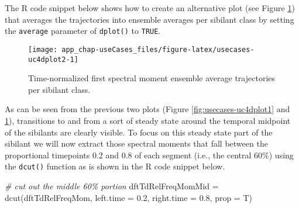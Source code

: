 \documentclass[
]{book}
\newenvironment{Shaded}{\begin{snugshade}}{\end{snugshade}}
\newcommand{\AttributeTok}[1]{\textcolor[rgb]{0.77,0.63,0.00}{#1}}
\newcommand{\CommentTok}[1]{\textcolor[rgb]{0.56,0.35,0.01}{\textit{#1}}}
\newcommand{\ConstantTok}[1]{\textcolor[rgb]{0.00,0.00,0.00}{#1}}
\newcommand{\DecValTok}[1]{\textcolor[rgb]{0.00,0.00,0.81}{#1}}
\newcommand{\FloatTok}[1]{\textcolor[rgb]{0.00,0.00,0.81}{#1}}
\newcommand{\FunctionTok}[1]{\textcolor[rgb]{0.00,0.00,0.00}{#1}}
\newcommand{\NormalTok}[1]{#1}
\newcommand{\OtherTok}[1]{\textcolor[rgb]{0.56,0.35,0.01}{#1}}
\newcommand{\SpecialCharTok}[1]{\textcolor[rgb]{0.00,0.00,0.00}{#1}}
\newcommand{\StringTok}[1]{\textcolor[rgb]{0.31,0.60,0.02}{#1}}
\begin{document}
The R code snippet below shows how to create an alternative plot (see Figure \ref{fig:usecases-uc4dplot2}) that averages the trajectories into ensemble averages per sibilant class by setting the \texttt{average} parameter of \texttt{dplot()} to \texttt{TRUE}.

\begin{Shaded}
\end{Shaded}

\begin{figure}

{\centering \texttt{[image: app\_chap-useCases\_files/figure-latex/usecases-uc4dplot2-1]} 

}

\caption{Time-normalized first spectral moment ensemble average trajectories per sibilant class.}\label{fig:usecases-uc4dplot2}
\end{figure}

As can be seen from the previous two plots (Figure \ref{fig:usecases-uc4dplot1} and \ref{fig:usecases-uc4dplot2}), transitions to and from a sort of steady state around the temporal midpoint of the sibilants are clearly visible. To focus on this steady state part of the sibilant we will now extract those spectral moments that fall between the proportional timepoints 0.2 and 0.8 of each segment (i.e., the central 60\%) using the \texttt{dcut()} function as is shown in the R code snippet below.

\begin{Shaded}
\begin{Highlighting}[]
\CommentTok{\# cut out the middle 60\% portion}
\NormalTok{dftTdRelFreqMomMid }\OtherTok{=} \FunctionTok{dcut}\NormalTok{(dftTdRelFreqMom,}
                          \AttributeTok{left.time =} \FloatTok{0.2}\NormalTok{,}
                          \AttributeTok{right.time =} \FloatTok{0.8}\NormalTok{,}
                          \AttributeTok{prop =}\NormalTok{ T)}
\end{Highlighting}
\end{Shaded}
\end{document}
